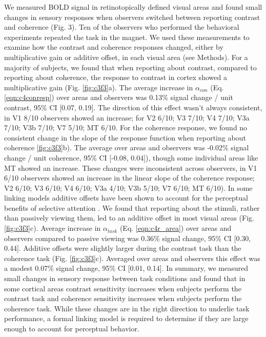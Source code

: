 We measured BOLD signal in retinotopically defined visual areas and found small changes in sensory responses when observers switched between reporting contrast and coherence (Fig. 3). Ten of the observers who performed the behavioral experiments repeated the task in the magnet. We used these measurements to examine how the contrast and coherence responses changed, either by multiplicative gain or additive offset, in each visual area (see Methods). For a majority of subjects, we found that when reporting about contrast, compared to reporting about coherence, the response to contrast in cortex showed a multiplicative gain (Fig. \ref{fig:c3f3}a). The average increase in $\alpha_{con}$ (Eq. \ref{eqn:c4conresp}) over areas and observers was 0.13\% signal change / unit contrast, 95\% CI [0.07, 0.19]. The direction of this effect wasn’t always consistent, in V1 8/10 observers showed an increase; for V2 6/10; V3 7/10; V4 7/10; V3a 7/10; V3b 7/10; V7 5/10; MT 6/10. For the coherence response, we found no consistent change in the slope of the response function when reporting about coherence \ref{fig:c3f3}b). The average over areas and observers was -0.02\% signal change / unit coherence, 95\% CI [-0.08, 0.04]), though some individual areas like MT showed an increase. These changes were inconsistent across observers, in V1 6/10 observers showed an increase in the linear slope of the coherence response; V2 6/10; V3 6/10; V4 6/10; V3a 4/10; V3b 5/10; V7 6/10; MT 6/10). In some linking models additive offsets have been shown to account for the perceptual benefits of selective attention \citep{Pestilli2011-gi}. We found that reporting about the stimuli, rather than passively viewing them, led to an additive offset in most visual areas (Fig. \ref{fig:c3f3}c). Average increase in $\alpha_{task}$ (Eq. \ref{eqn:c4r_area}) over areas and observers compared to passive viewing was 0.36\% signal change, 95\% CI [0.30, 0.44]. Additive offsets were slightly larger during the contrast task than the coherence task (Fig. \ref{fig:c3f3}c). Averaged over areas and observers this effect was a modest 0.07\% signal change, 95\% CI [0.01, 0.14]. In summary, we measured small changes in sensory response between task conditions and found that in some cortical areas contrast sensitivity increases when subjects perform the contrast task and coherence sensitivity increases when subjects perform the coherence task. While these changes are in the right direction to underlie task performance, a formal linking model is required to determine if they are large enough to account for perceptual behavior.

